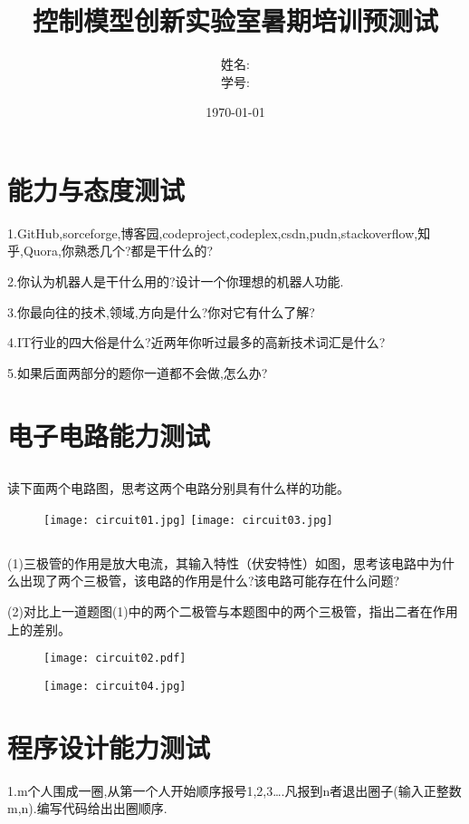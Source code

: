 \documentclass[12pt,a4paper]{article}
\title{控制模型创新实验室暑期培训预测试}	%
\author{姓名:\phantom{5cm}\\学号:\phantom{5cm}}
\date{\today}
\begin{document}
\maketitle



\section{能力与态度测试}

1.GitHub,sorceforge,博客园,codeproject,codeplex,csdn,pudn,stackoverflow,知乎,Quora,你熟悉几个?都是干什么的?



2.你认为机器人是干什么用的?设计一个你理想的机器人功能.



3.你最向往的技术,领域,方向是什么?你对它有什么了解?


4.IT行业的四大俗是什么?近两年你听过最多的高新技术词汇是什么?



5.如果后面两部分的题你一道都不会做,怎么办?


\section{电子电路能力测试}

\subsection{}
读下面两个电路图，思考这两个电路分别具有什么样的功能。

\begin{figure}[H]
\texttt{[image: circuit01.jpg]}
\qquad
\texttt{[image: circuit03.jpg]}
\end{figure}


\subsection{}
(1)三极管的作用是放大电流，其输入特性（伏安特性）如图，思考该电路中为什么出现了两个三极管，该电路的作用是什么?该电路可能存在什么问题?

(2)对比上一道题图(1)中的两个二极管与本题图中的两个三极管，指出二者在作用上的差别。
\begin{figure}[H]
\texttt{[image: circuit02.pdf]}

\end{figure}

\begin{figure}[H]
\texttt{[image: circuit04.jpg]}

\end{figure}


\section{程序设计能力测试}
1.m个人围成一圈,从第一个人开始顺序报号1,2,3\dots .凡报到n者退出圈子(输入正整数m,n).编写代码给出出圈顺序.


    
\end{document}
